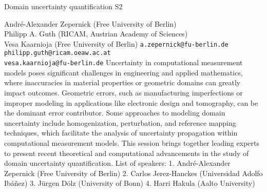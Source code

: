 \begin{session}
 {Domain uncertainty quantification}%
 {}%
 {}%
 {}%
 {}%
 {}%
 {}%
 {S2}%
 {\thirdorganizer{}{}{}}%

 {Andr\'e-Alexander Zepernick {\rm (Free University of Berlin)}\\
 Philipp A. Guth {\rm (RICAM, Austrian Academy of Sciences)}\\ Vesa Kaarnioja {\rm (Free University of Berlin)}}%
 {{\tt a.zepernick@fu-berlin.de}\\{\tt philipp.guth@ricam.oeaw.ac.at}\\{\tt vesa.kaarnioja@fu-berlin.de}}%
 {}%
 {}%
 {}%
 {}%
 Uncertainty in computational measurement models poses significant challenges in engineering and applied mathematics, where inaccuracies in material properties or geometric domains can greatly impact outcomes. Geometric errors, such as manufacturing imperfections or improper modeling in applications like electronic design and tomography, can be the dominant error contributor. Some approaches to modeling domain uncertainty include homogenization, perturbation, and reference mapping techniques, which facilitate the analysis of uncertainty propagation within computational measurement models. This session brings together leading experts to present recent theoretical and computational advancements in the study of domain uncertainty quantification.
 List of speakers:
 1. Andr\'e-Alexander Zepernick (Free University of Berlin)
 2. Carlos Jerez-Hanckes (Universidad Adolfo Ib\'{a}\~{n}ez)
 3. J\"urgen D\"olz (University of Bonn)
 4. Harri Hakula (Aalto University)
\end{session}



\clearpage

